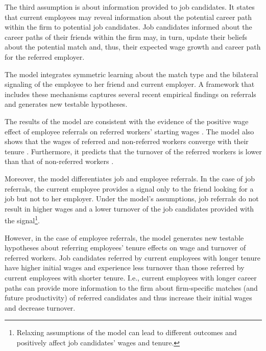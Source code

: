 \documentclass[12pt]{article}
\begin{document}
The third assumption is about information provided to job candidates. It states that current employees may reveal information about the potential career path within the firm to potential job candidates. Job candidates informed about the career paths of their friends within the firm may, in turn, update their beliefs about the potential match and, thus, their expected wage growth and career path for the referred employer.

The model integrates symmetric learning about the match type and the bilateral signaling of the employee to her friend and current employer. A framework that includes these mechanisms captures several recent empirical findings on referrals and generates new testable hypotheses.

The results of the model are consistent with the evidence of the positive wage effect of employee referrals on referred workers' starting wages  \citep{brown2016informal, dustmann2016referral, galenianos2013learning, montgomery1991social, simon1992matchmaker, corcoran1980most}. The model also shows that the wages of referred and non-referred workers converge with their tenure \citep{galenianos2013learning, dustmann2016referral, simon1992matchmaker, brown2016informal}. Furthermore, it predicts that the turnover of the referred workers is lower than that of non-referred workers \citep{simon1992matchmaker, dustmann2016referral, brown2016informal}.

Moreover, the model differentiates job and employee referrals. In the case of job referrals, the current employee provides a signal only to the friend looking for a job but not to her employer. Under the model's assumptions, job referrals do not result in higher wages and a lower turnover of the job candidates provided with the signal\footnote{Relaxing assumptions of the model can lead to different outcomes and positively affect job candidates' wages and tenure.}. 

However, in the case of employee referrals, the model generates new testable hypotheses about referring employees' tenure effects on wage and turnover of referred workers. Job candidates referred by current employees with longer tenure have higher initial wages and experience less turnover than those referred by current employees with shorter tenure. I.e., current employees with longer career paths can provide more information to the firm about firm-specific matches (and future productivity) of referred candidates and thus increase their initial wages and decrease turnover.
\end{document}
